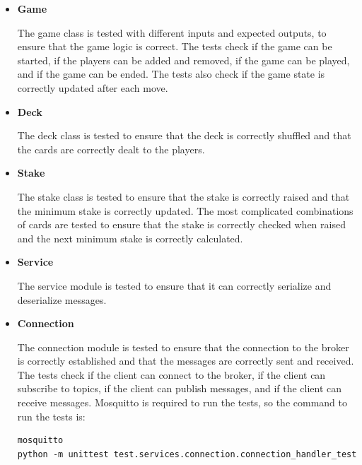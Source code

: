 \documentclass{scrartcl}
\begin{document}
\begin{itemize}
      \item \textbf{Game}\par
            The game class is tested with different inputs and expected outputs, to ensure that the 
            game logic is correct. The tests check if the game can be started, if the players can be 
            added and removed, if the game can be played, and if the game can be ended. The tests also 
            check if the game state is correctly updated after each move.
      \item \textbf{Deck}\par
            The deck class is tested to ensure that the deck is correctly shuffled and that the cards 
            are correctly dealt to the players.
      \item \textbf{Stake}\par
            The stake class is tested to ensure that the stake is correctly raised and that the 
            minimum stake is correctly updated. The most complicated combinations of cards are tested 
            to ensure that the stake is correctly checked when raised and the next minimum stake is 
            correctly calculated.
      \item \textbf{Service}\par
            The service module is tested to ensure that it can correctly serialize and deserialize messages.
      \item \textbf{Connection}\par
            The connection module is tested to ensure that the connection to the broker is correctly 
            established and that the messages are correctly sent and received. The tests check if the 
            client can connect to the broker, if the client can subscribe to topics, if the client can 
            publish messages, and if the client can receive messages.
            Mosquitto is required to run the tests, so the command to run the tests is:
            \begin{verbatim}
mosquitto
python -m unittest test.services.connection.connection_handler_test
            \end{verbatim}

\end{itemize}
\end{document}
